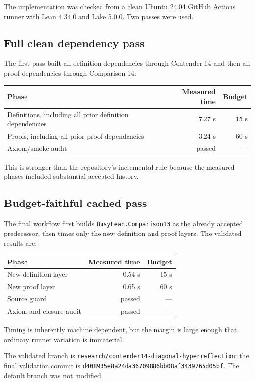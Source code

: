 \documentclass[11pt]{article}
\theoremstyle{definition}
\newcommand{\code}[1]{\texttt{#1}}
\begin{document}
The implementation was checked from a clean Ubuntu 24.04 GitHub Actions runner with Lean 4.34.0 and Lake 5.0.0.  Two passes were used.

\subsection{Full clean dependency pass}

The first pass built all definition dependencies through Contender 14 and then all proof dependencies through Comparison 14:
\begin{center}
\begin{tabular}{@{}lrr@{}}
\toprule
Phase & Measured time & Budget \\
\midrule
Definitions, including all prior definition dependencies & 7.27 s & 15 s \\
Proofs, including all prior proof dependencies & 3.24 s & 60 s \\
Axiom/smoke audit & passed & --- \\
\bottomrule
\end{tabular}
\end{center}
This is stronger than the repository's incremental rule because the measured phases included substantial accepted history.

\subsection{Budget-faithful cached pass}

The final workflow first builds \code{BusyLean.Comparison13} as the already accepted predecessor, then times only the new definition and proof layers.  The validated results are:
\begin{center}
\begin{tabular}{@{}lrr@{}}
\toprule
Phase & Measured time & Budget \\
\midrule
New definition layer & 0.54 s & 15 s \\
New proof layer & 0.65 s & 60 s \\
Source guard & passed & --- \\
Axiom and closure audit & passed & --- \\
\bottomrule
\end{tabular}
\end{center}
Timing is inherently machine dependent, but the margin is large enough that ordinary runner variation is immaterial.

The validated branch is \code{research/contender14-diagonal-hyperreflection}; the final validation commit is \code{d408935e8a24da36709886bb08af3439765d05bf}.  The default branch was not modified.
\end{document}
